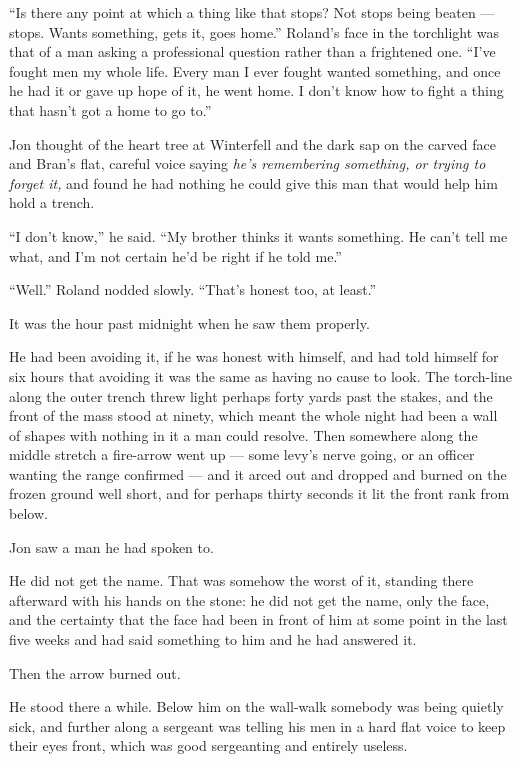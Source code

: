 “Is there any point at which a thing like that stops? Not stops being beaten — stops. Wants something, gets it, goes home.” Roland’s face in the torchlight was that of a man asking a professional question rather than a frightened one. “I’ve fought men my whole life. Every man I ever fought wanted something, and once he had it or gave up hope of it, he went home. I don’t know how to fight a thing that hasn’t got a home to go to.”

Jon thought of the heart tree at Winterfell and the dark sap on the carved face and Bran’s flat, careful voice saying \textit{he’s remembering something, or trying to forget it,} and found he had nothing he could give this man that would help him hold a trench.

“I don’t know,” he said. “My brother thinks it wants something. He can’t tell me what, and I’m not certain he’d be right if he told me.”

“Well.” Roland nodded slowly. “That’s honest too, at least.”

\sceneBreak

It was the hour past midnight when he saw them properly.

He had been avoiding it, if he was honest with himself, and had told himself for six hours that avoiding it was the same as having no cause to look. The torch-line along the outer trench threw light perhaps forty yards past the stakes, and the front of the mass stood at ninety, which meant the whole night had been a wall of shapes with nothing in it a man could resolve. Then somewhere along the middle stretch a fire-arrow went up — some levy’s nerve going, or an officer wanting the range confirmed — and it arced out and dropped and burned on the frozen ground well short, and for perhaps thirty seconds it lit the front rank from below.

Jon saw a man he had spoken to.

He did not get the name. That was somehow the worst of it, standing there afterward with his hands on the stone: he did not get the name, only the face, and the certainty that the face had been in front of him at some point in the last five weeks and had said something to him and he had answered it.

Then the arrow burned out.

He stood there a while. Below him on the wall-walk somebody was being quietly sick, and further along a sergeant was telling his men in a hard flat voice to keep their eyes front, which was good sergeanting and entirely useless.


